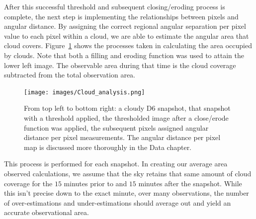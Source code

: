 After this successful threshold and subsequent closing/eroding process is complete, the next step is implementing the relationships between pixels and angular distance.
By assigning the correct regional angular separation per pixel value to each pixel within a cloud, we are able to estimate the angular area that cloud covers.
Figure~\ref{colorclouds} shows the processes taken in calculating the area occupied by clouds.
Note that both a filling and eroding function was used to attain the lower left image.
The observable area during that time is the cloud coverage subtracted from the total observation area.


\begin{figure}[ht!]
  \centering
  \texttt{[image: images/Cloud\_analysis.png]}
  \caption[Calculating cloud area coverage from thresholding and applying our angular distance per pixel map.]{From top left to bottom right: a cloudy D6 snapshot, that snapshot with a threshold applied, the thresholded image after a close/erode function was applied, the subsequent pixels assigned angular distance per pixel measurements.  The angular distance per pixel map is discussed more thoroughly in the Data chapter.}
  \label{colorclouds}
\end{figure}

This process is performed for each snapshot.
In creating our average area observed calculations, we assume that the sky retains that same amount of cloud coverage for the $15$ minutes prior to and $15$ minutes after the snapshot.
While this isn't precise down to the exact minute, over many observations, the number of over-estimations and under-estimations should average out and yield an accurate observational area.























 
